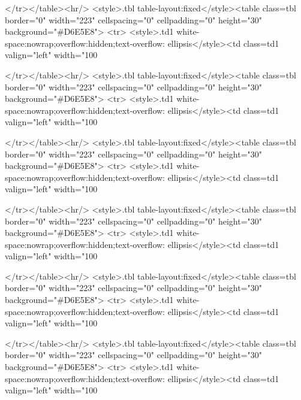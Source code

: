 </tr></table><hr/>
<style>.tbl {table-layout:fixed}</style><table class=tbl border="0" width="223" cellspacing="0" cellpadding="0" height="30" background="#D6E5E8">
<tr>
<style>.td1 {white-space:nowrap;overflow:hidden;text-overflow: ellipsis}</style><td class=td1 valign="left" width="100%

</tr></table><hr/>
<style>.tbl {table-layout:fixed}</style><table class=tbl border="0" width="223" cellspacing="0" cellpadding="0" height="30" background="#D6E5E8">
<tr>
<style>.td1 {white-space:nowrap;overflow:hidden;text-overflow: ellipsis}</style><td class=td1 valign="left" width="100%

</tr></table><hr/>
<style>.tbl {table-layout:fixed}</style><table class=tbl border="0" width="223" cellspacing="0" cellpadding="0" height="30" background="#D6E5E8">
<tr>
<style>.td1 {white-space:nowrap;overflow:hidden;text-overflow: ellipsis}</style><td class=td1 valign="left" width="100%

</tr></table><hr/>
<style>.tbl {table-layout:fixed}</style><table class=tbl border="0" width="223" cellspacing="0" cellpadding="0" height="30" background="#D6E5E8">
<tr>
<style>.td1 {white-space:nowrap;overflow:hidden;text-overflow: ellipsis}</style><td class=td1 valign="left" width="100%

</tr></table><hr/>
<style>.tbl {table-layout:fixed}</style><table class=tbl border="0" width="223" cellspacing="0" cellpadding="0" height="30" background="#D6E5E8">
<tr>
<style>.td1 {white-space:nowrap;overflow:hidden;text-overflow: ellipsis}</style><td class=td1 valign="left" width="100%

</tr></table><hr/>
<style>.tbl {table-layout:fixed}</style><table class=tbl border="0" width="223" cellspacing="0" cellpadding="0" height="30" background="#D6E5E8">
<tr>
<style>.td1 {white-space:nowrap;overflow:hidden;text-overflow: ellipsis}</style><td class=td1 valign="left" width="100%

